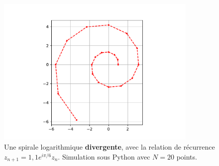 \documentclass[12pt]{article}
\theoremstyle{definition}
\begin{document}
\begin{figure}[H]
	\centering
	\includegraphics[width=0.86\textwidth]{resources/divergo.pdf}
	\caption{Une spirale logarithmique \textbf{divergente}, avec la relation de récurrence $z_{n+1} = 1,\!1e^{i\pi/6}z_n$. Simulation sous Python avec $N=20$ points.}
\end{figure}
\end{document}
